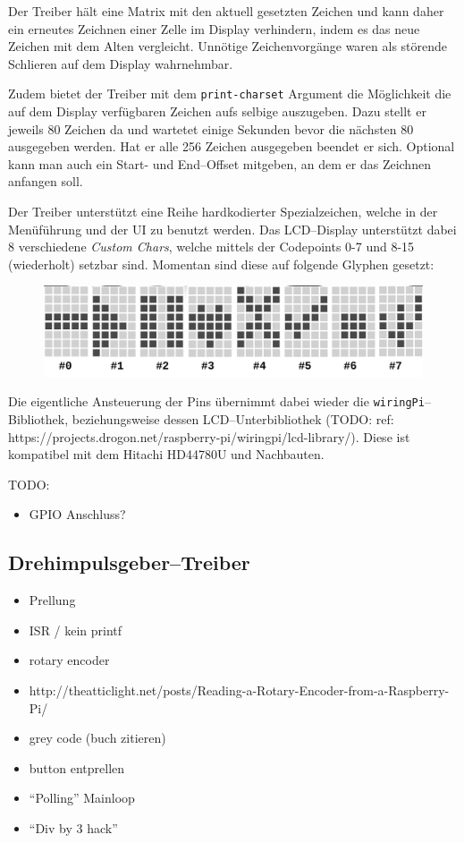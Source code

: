 \documentclass[11pt,ngerman,toc=listof,index=totoc]{scrreprt}
\providecommand{\tightlist}{%
  \setlength{\itemsep}{0pt}\setlength{\parskip}{0pt}}
\begin{document}
Der Treiber hält eine Matrix mit den aktuell gesetzten Zeichen und kann
daher ein erneutes Zeichnen einer Zelle im Display verhindern, indem es
das neue Zeichen mit dem Alten vergleicht. Unnötige Zeichenvorgänge
waren als störende Schlieren auf dem Display wahrnehmbar.

Zudem bietet der Treiber mit dem \texttt{print-charset} Argument die
Möglichkeit die auf dem Display verfügbaren Zeichen aufs selbige
auszugeben. Dazu stellt er jeweils 80 Zeichen da und wartetet einige
Sekunden bevor die nächsten 80 ausgegeben werden. Hat er alle 256
Zeichen ausgegeben beendet er sich. Optional kann man auch ein Start-
und End--Offset mitgeben, an dem er das Zeichnen anfangen soll.

Der Treiber unterstützt eine Reihe hardkodierter Spezialzeichen, welche
in der Menüführung und der UI zu benutzt werden. Das LCD--Display
unterstützt dabei 8 verschiedene \emph{Custom Chars}, welche mittels der
Codepoints 0-7 und 8-15 (wiederholt) setzbar sind. Momentan sind diese
auf folgende Glyphen gesetzt:

\begin{figure}[h!]
  \centering
  \includegraphics[width=1.0\textwidth]{images/symbols.png}
  \caption{}
  \label{eulenfunk-symbols}
\end{figure}

Die eigentliche Ansteuerung der Pins übernimmt dabei wieder die
\texttt{wiringPi}--Bibliothek, beziehungsweise dessen
LCD--Unterbibliothek (TODO: ref:
https://projects.drogon.net/raspberry-pi/wiringpi/lcd-library/). Diese
ist kompatibel mit dem Hitachi HD44780U und Nachbauten.

TODO:

\begin{itemize}
\tightlist
\item
  GPIO Anschluss?
\end{itemize}

\subsection{Drehimpulsgeber--Treiber}\label{drehimpulsgebertreiber}

\begin{itemize}
\tightlist
\item
  Prellung
\item
  ISR / kein printf
\item
  rotary encoder
\item
  http://theatticlight.net/posts/Reading-a-Rotary-Encoder-from-a-Raspberry-Pi/
\item
  grey code (buch zitieren)
\item
  button entprellen
\item
  \enquote{Polling} Mainloop
\item
  \enquote{Div by 3 hack}
\end{itemize}
\end{document}
